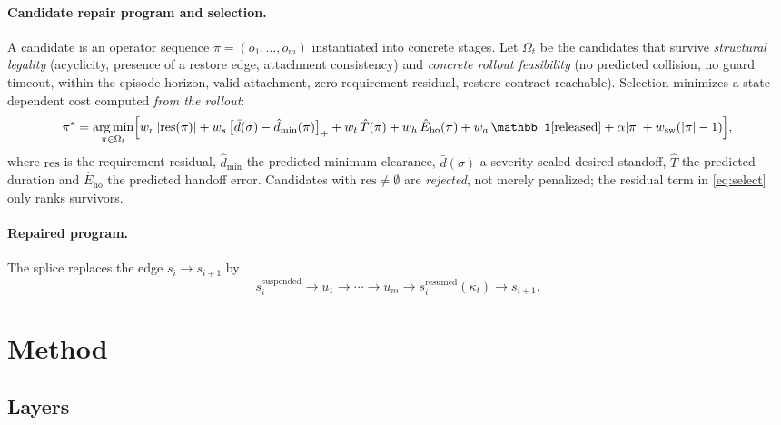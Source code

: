 \documentclass[11pt]{article}
\begin{document}
\paragraph{Candidate repair program and selection.}
A candidate is an operator sequence $\pi=(o_1,\dots,o_m)$ instantiated into
concrete stages. Let $\Omega_t$ be the candidates that survive
\emph{structural legality} (acyclicity, presence of a restore edge, attachment
consistency) and \emph{concrete rollout feasibility} (no predicted collision, no
guard timeout, within the episode horizon, valid attachment, zero requirement
residual, restore contract reachable). Selection minimizes a state-dependent
cost computed \emph{from the rollout}:
\begin{equation}
\label{eq:select}
\pi^\star=\operatorname*{arg\,min}_{\pi\in\Omega_t}
\Bigl[
w_r\,|\mathrm{res}(\pi)|
+ w_s\,\bigl[\bar d(\sigma)-\hat d_{\min}(\pi)\bigr]_+
+ w_t\,\hat T(\pi)
+ w_h\,\hat E_{\mathrm{ho}}(\pi)
+ w_a\,\mathbb 1[\text{released}]
+ \alpha|\pi|
+ w_{\mathrm{sw}}(|\pi|-1)
\Bigr],
\end{equation}
where $\mathrm{res}$ is the requirement residual, $\hat d_{\min}$ the predicted
minimum clearance, $\bar d(\sigma)$ a severity-scaled desired standoff, $\hat T$
the predicted duration and $\hat E_{\mathrm{ho}}$ the predicted handoff error.
Candidates with $\mathrm{res}\neq\emptyset$ are \emph{rejected}, not merely
penalized; the residual term in \eqref{eq:select} only ranks survivors.

\paragraph{Repaired program.}
The splice replaces the edge $s_i\to s_{i+1}$ by
\begin{equation}
\label{eq:splice}
s_i^{\mathrm{suspended}}
\rightarrow u_1\rightarrow\cdots\rightarrow u_m
\rightarrow s_i^{\mathrm{resumed}}(\kappa_t)
\rightarrow s_{i+1}.
\end{equation}

\section{Method}

\subsection{Layers}
\end{document}
